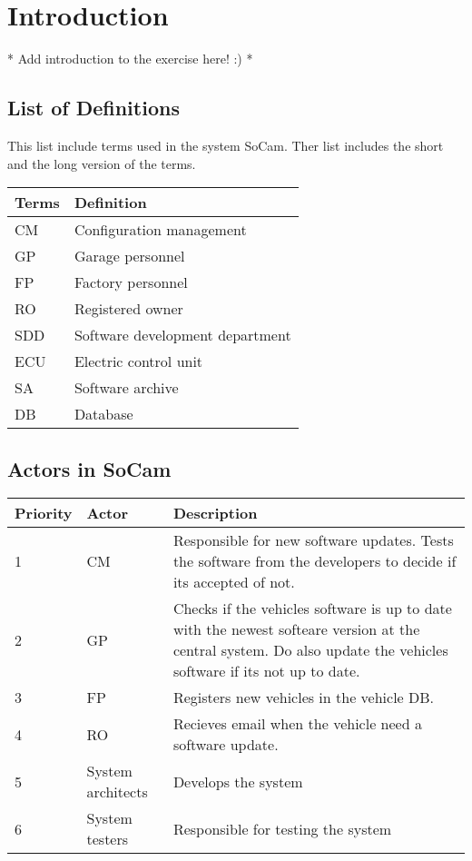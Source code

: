 \chapter{Introduction}

	* Add introduction to the exercise here! :) *

	\clearpage
	\section{List of Definitions}

	This list include terms used in the system SoCam. Ther list includes
	the short and the long version of the terms. 

		\begin{table}[H]
			\begin{tabular}{ p{3cm} | p{8cm} }
				\hline
				\rowcolor{gray}
				{\bf Terms} & {\bf Definition} \\ \hline
					CM & Configuration management \\ \hline
					GP & Garage personnel \\ \hline
					FP & Factory personnel \\ \hline
					RO & Registered owner \\ \hline
					SDD & Software development department \\ \hline
					ECU & Electric control unit \\ \hline
					SA & Software archive \\ \hline
					DB & Database \\ \hline
				\end{tabular}
		\end{table}

	\section{Actors in SoCam}

		\begin{table}[H]
			\begin{tabular}{ p{2cm} | p{3.5cm} | p{7cm} }
				\hline
				\rowcolor{gray}
				{\bf Priority} & {\bf Actor} & {\bf Description} \\ \hline
					1 & CM & Responsible for new software updates. 
					Tests the software from the developers to decide if its accepted of not. \\ \hline
					2 & GP & Checks if the vehicles software is up to date with the newest 
					softeare version at the central system. Do also update the vehicles 
					software if its not up to date. \\ \hline
					3 & FP & Registers new vehicles in the vehicle DB. \\ \hline
					4 & RO & Recieves email when the vehicle need a software update. \\ \hline
					5 & System architects & Develops the system \\ \hline
					6 & System testers & Responsible for testing the system \\ \hline
				\end{tabular}
		\end{table}
